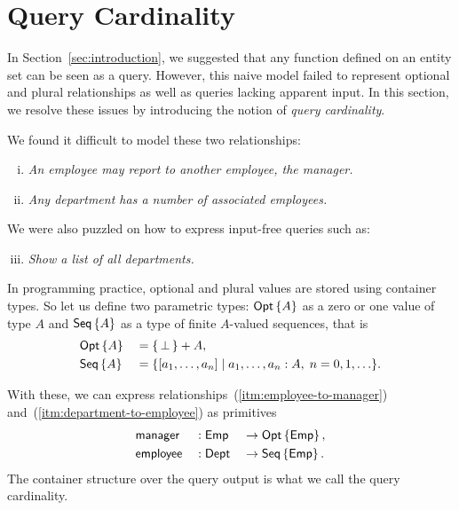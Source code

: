 
\section{Query Cardinality}
\label{sec:cardinality}

In Section~\ref{sec:introduction}, we suggested that any function defined on an
entity set can be seen as a query.  However, this naive model failed to
represent optional and plural relationships as well as queries lacking apparent
input.  In this section, we resolve these issues by introducing the notion of
\emph{query cardinality}.

We found it difficult to model these two relationships:

\begin{enumerate}[(i)]
\item \label{itm:employee-to-manager}
\emph{An employee may report to another employee, the manager.}

\item \label{itm:department-to-employee}
\emph{Any department has a number of associated employees.}
\end{enumerate}

We were also puzzled on how to express input-free queries such as:

\begin{enumerate}[(i)]
\setcounter{enumi}{2}
\item \label{itm:department-set}
\emph{Show a list of all departments.}
\end{enumerate}

In programming practice, optional and plural values are stored using container
types.  So let us define two parametric types: $\textup{\textsf{Opt}}\left\{A\right\}$ as a zero or one value
of type $A$ and $\textup{\textsf{Seq}}\left\{A\right\}$ as a type of finite $A$-valued sequences, that is
\begin{alignat*}{2}
    & \textup{\textsf{Opt}}\left\{A\right\} && = \{\, \bot \,\} + A, \\
    & \textup{\textsf{Seq}}\left\{A\right\} && = \{[a_1,\ldots,a_n] \mid a_1,\ldots,a_n:A,\; n=0,1,\ldots \}.
\end{alignat*}

With these, we can express relationships~(\ref{itm:employee-to-manager})
and~(\ref{itm:department-to-employee}) as primitives
\begin{alignat*}{3}
    & \textup{\textsf{manager}} && : \textup{\textsf{Emp}} && \to \textup{\textsf{Opt}}\left\{\textup{\textsf{Emp}}\right\}, \\
    & \textup{\textsf{employee}} && : \textup{\textsf{Dept}} && \to \textup{\textsf{Seq}}\left\{\textup{\textsf{Emp}}\right\}.
\end{alignat*}
The container structure over the query output is what we call the query
cardinality.

